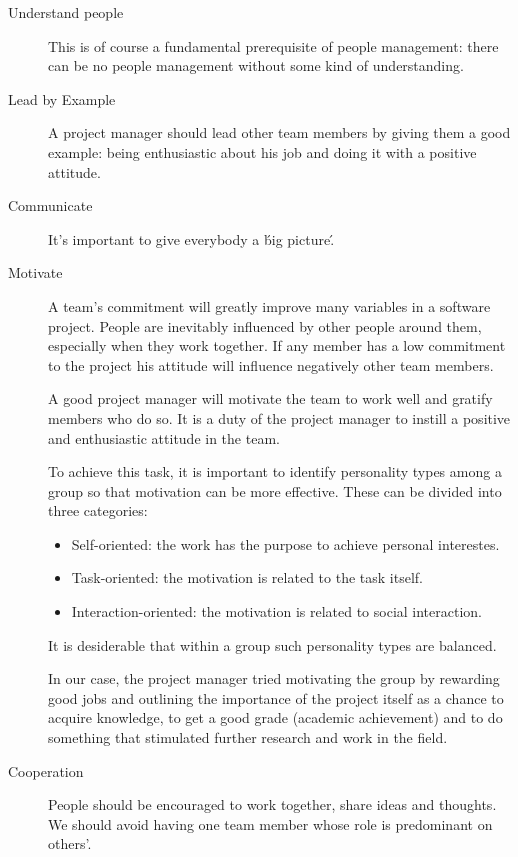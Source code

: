 \begin{description}

\item[Understand people]
This is of course a fundamental prerequisite of people management: there can be no people management without some kind of understanding.

\item[Lead by Example]
A project manager should lead other team members by giving them a good example: being enthusiastic about his job
and doing it with a positive attitude.

\item[Communicate]
It's important to give everybody a \'big picture\'.

\item[Motivate]
A team's commitment will greatly improve many variables in a software project.
People are inevitably influenced by other people around them, especially when they work together.
If any member has a low commitment to the project his attitude will influence negatively other team members.

A good project manager will motivate the team to work well and gratify members who do so.
It is a duty of the project manager to instill a positive and enthusiastic attitude in the team.

To achieve this task, it is important to identify personality types among a group so that
motivation can be more effective. These can be divided into three categories:
  \begin{itemize}
  \item Self-oriented: the work has the purpose to achieve personal interestes.
  \item Task-oriented: the motivation is related to the task itself.
  \item Interaction-oriented: the motivation is related to social interaction.
  \end{itemize}

It is desiderable that within a group such personality types are balanced.

In our case, the project manager tried motivating the group by rewarding good jobs
and outlining the importance of the project itself as a chance to acquire knowledge,
to get a good grade (academic achievement) and to do something that stimulated further
research and work in the field.

\item[Cooperation]
People should be encouraged to work together, share ideas and thoughts.
We should avoid having one team member whose role is predominant on others'.


\end{description}
